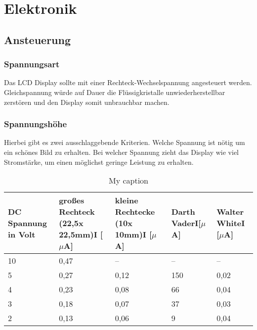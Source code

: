 \section{Elektronik}
\subsection{Ansteuerung}
\subsubsection{Spannungsart}
Das LCD Display sollte mit einer Rechteck-Wechselspannung angesteuert werden. Gleichspannung würde auf Dauer die Flüssigkristalle unwiederherstellbar zerstören und den Display somit unbrauchbar machen.
\subsubsection{Spannungshöhe}
Hierbei gibt es zwei ausschlaggebende Kriterien. Welche Spannung ist nötig um ein schönes Bild zu erhalten. Bei welcher Spannung zieht das Display wie viel Stromstärke, um einen möglichst geringe Leistung zu erhalten.
\begin{table}[]
	\centering
	\caption{My caption}
	\label{my-label}
	\begin{tabular}{p{1cm}|p{1cm}|p{1cm}|p{1cm}|p{1cm}}
		\toprule
		DC Spannung in Volt      & großes Rechteck (22,5x 22,5mm)I {[}$\mu$A{]} & kleine Rechtecke (10x 10mm)I {[}$\mu$A{]} & Darth VaderI{[}$\mu$A{]}     & Walter WhiteI {[}$\mu$A{]}    \\ \midrule
		\multicolumn{1}{|l|}{10} & \multicolumn{1}{l|}{0,47}               & \multicolumn{1}{l|}{--}              & \multicolumn{1}{l|}{--}  & \multicolumn{1}{l|}{--}   \\ \midrule
		\multicolumn{1}{|l|}{5}  & \multicolumn{1}{l|}{0,27}               & \multicolumn{1}{l|}{0,12}            & \multicolumn{1}{l|}{150} & \multicolumn{1}{l|}{0,02} \\ \midrule
		\multicolumn{1}{|l|}{4}  & \multicolumn{1}{l|}{0,23}               & \multicolumn{1}{l|}{0,08}            & \multicolumn{1}{l|}{66}  & \multicolumn{1}{l|}{0,04} \\ \midrule
		\multicolumn{1}{|l|}{3}  & \multicolumn{1}{l|}{0,18}               & \multicolumn{1}{l|}{0,07}            & \multicolumn{1}{l|}{37}  & \multicolumn{1}{l|}{0,03} \\ \midrule
		\multicolumn{1}{|l|}{2}  & \multicolumn{1}{l|}{0,13}               & \multicolumn{1}{l|}{0,06}            & \multicolumn{1}{l|}{9}   & \multicolumn{1}{l|}{0,04} \\ \bottomrule
	\end{tabular}
\end{table}



